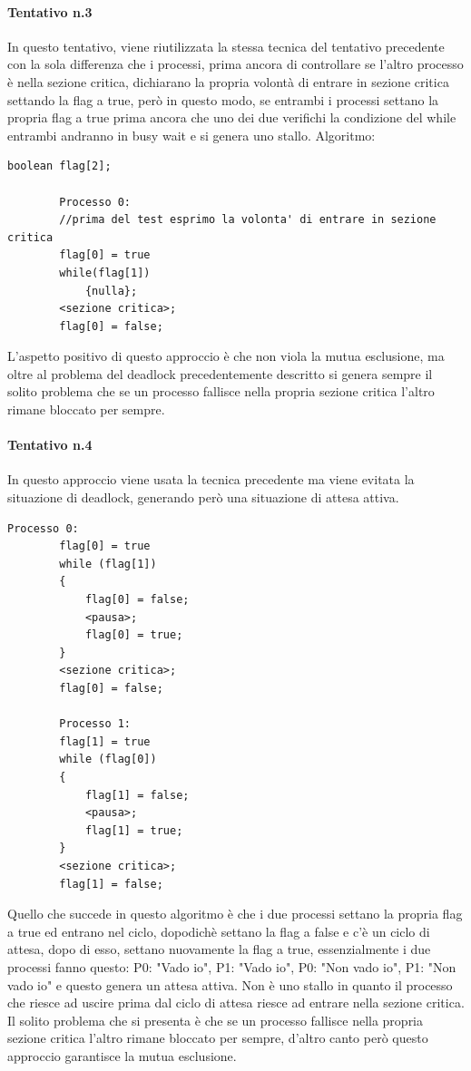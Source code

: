 \documentclass[12pt, letterpaper]{report}
\begin{document}
	\paragraph{Tentativo n.3}
	In questo tentativo, viene riutilizzata la stessa tecnica del tentativo precedente con la sola differenza che i processi, prima ancora di controllare se l'altro processo è nella sezione critica, dichiarano la propria volontà di entrare in sezione critica settando la flag a true, però in questo modo, se entrambi i processi settano la propria flag a true prima ancora che uno dei due verifichi la condizione del while entrambi andranno in busy wait e si genera uno stallo.
	Algoritmo:
	\begin{lstlisting}[style=pascalstyle]
		boolean flag[2];

		Processo 0:
		//prima del test esprimo la volonta' di entrare in sezione critica
		flag[0] = true
		while(flag[1])
			{nulla};
		<sezione critica>;
		flag[0] = false;
	\end{lstlisting}
	L'aspetto positivo di questo approccio è che non viola la mutua esclusione, ma oltre al problema del deadlock precedentemente descritto si genera sempre il solito problema che se un processo fallisce nella propria sezione critica l'altro rimane bloccato per sempre.
	\paragraph{Tentativo n.4} In questo approccio viene usata la tecnica precedente ma viene evitata la situazione di deadlock, generando però una situazione di attesa attiva.
	\begin{lstlisting}[style=pascalstyle]
		Processo 0:
		flag[0] = true
		while (flag[1])
		{
			flag[0] = false;
			<pausa>;
			flag[0] = true;
		}
		<sezione critica>;
		flag[0] = false;

		Processo 1:
		flag[1] = true
		while (flag[0])
		{
			flag[1] = false;
			<pausa>;
			flag[1] = true;
		}
		<sezione critica>;
		flag[1] = false;
	\end{lstlisting}
	Quello che succede in questo algoritmo è che i due processi settano la propria flag a true ed entrano nel ciclo, dopodichè settano la flag a false e c'è un ciclo di attesa, dopo di esso, settano nuovamente la flag a true, essenzialmente i due processi fanno questo: P0: "Vado io", P1: "Vado io", P0: "Non vado io", P1: "Non vado io" e questo genera un attesa attiva. Non è uno stallo in quanto il processo che riesce ad uscire prima dal ciclo di attesa riesce ad entrare nella sezione critica. Il solito problema che si presenta è che se un processo fallisce nella propria sezione critica l'altro rimane bloccato per sempre, d'altro canto però questo approccio garantisce la mutua esclusione.
\end{document}
